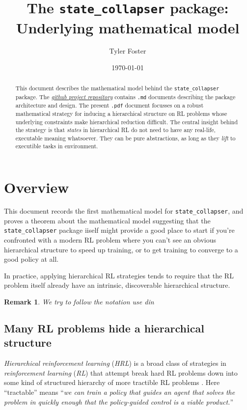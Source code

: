 \documentclass[11pt]{article}
\title{The \texttt{state\_collapser} package:\\ {Underlying mathematical model}}
\author{Tyler Foster}
\date{\today}
\newtheorem{remark}{Remark}[subsection]
\begin{document}
\maketitle

\begin{abstract}
This document describes the mathematical model behind the \texttt{state\_collapser} package. The \href{https://github.com/TYLERSFOSTER/state_collapser}{{\em github project repository}} contains \texttt{.md} documents describing the package architecture and design. The present \texttt{.pdf} document focusses on a robust mathematical strategy for inducing a hierarchical structure on RL problems whose underlying constraints make hierarchical reduction difficult. The central insight behind the strategy is that {\em states} in hierarchical RL do not need to have any real-life, executable meaning whatsoever. They can be pure abstractions, as long as they {\em lift} to executible tasks in environment.
\end{abstract}

\setcounter{tocdepth}{2}
\tableofcontents

\section{Overview}

This document records the first mathematical model for \texttt{state\_collapser}, and proves a theorem about the mathematical model suggesting that the \texttt{state\_collapser} package iiself might provide a good place to start if you're confronted with a modern RL problem where you can't see an obvious hierarchical structure to speed up training, or to get training to converge to a good policy at all.

In practice, applying hierarchical RL strategies tends to require that the RL problem itself already have an intrinsic, discoverable hierarchical structure.

\begin{remark}
We try to follow the notation use din \cite{SBRL}


\cite{MalikThesis}

\end{remark}

\subsection{Many RL problems hide a hierarchical structure}

{\em Hierarchical reinforcement learning} ({\em HRL}) is a broad class of strategies in {\em reinforcement learning} ({\em RL}) that attempt break hard RL problems down into some kind of structured hierarchy of more tractible RL problems \cite{PSTQ}. Here ``tractable'' means ``{\em we can train a policy that guides an agent that solves the problem in quickly enough that the policy-guided control is a viable product.}''
\end{document}
